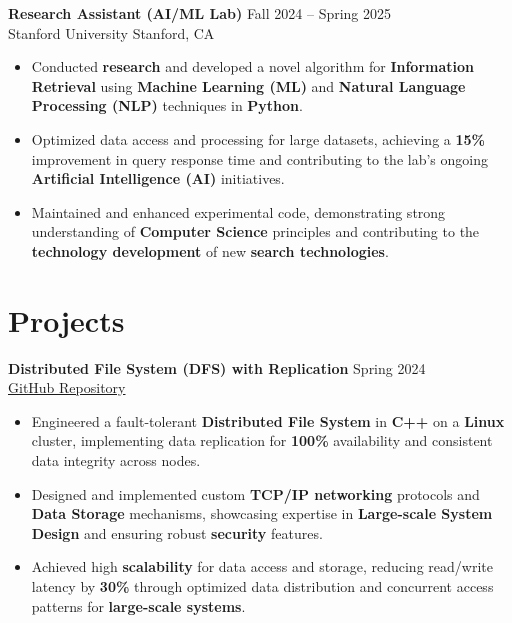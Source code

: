 \documentclass[11pt,a4paper,sans]{article}
\begin{document}
\textbf{Research Assistant (AI/ML Lab)} \hfill Fall 2024 -- Spring 2025 \\
Stanford University \hfill Stanford, CA
\begin{itemize}[leftmargin=*]
    \item Conducted \textbf{research} and developed a novel algorithm for \textbf{Information Retrieval} using \textbf{Machine Learning (ML)} and \textbf{Natural Language Processing (NLP)} techniques in \textbf{Python}.
    \item Optimized data access and processing for large datasets, achieving a \textbf{15\%} improvement in query response time and contributing to the lab's ongoing \textbf{Artificial Intelligence (AI)} initiatives.
    \item Maintained and enhanced experimental code, demonstrating strong understanding of \textbf{Computer Science} principles and contributing to the \textbf{technology development} of new \textbf{search technologies}.
\end{itemize}

\section*{Projects}
\textbf{Distributed File System (DFS) with Replication} \hfill Spring 2024 \\
\href{https://github.com/alexchen-dev/distributed-file-system}{GitHub Repository}
\begin{itemize}[leftmargin=*]
    \item Engineered a fault-tolerant \textbf{Distributed File System} in \textbf{C++} on a \textbf{Linux} cluster, implementing data replication for \textbf{100\%} availability and consistent data integrity across nodes.
    \item Designed and implemented custom \textbf{TCP/IP networking} protocols and \textbf{Data Storage} mechanisms, showcasing expertise in \textbf{Large-scale System Design} and ensuring robust \textbf{security} features.
    \item Achieved high \textbf{scalability} for data access and storage, reducing read/write latency by \textbf{30\%} through optimized data distribution and concurrent access patterns for \textbf{large-scale systems}.
\end{itemize}
\end{document}
